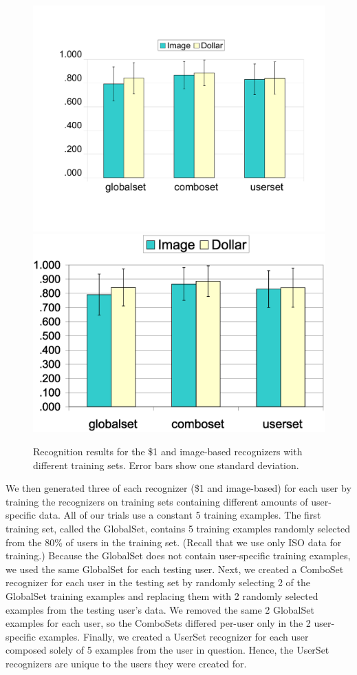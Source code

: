 \documentclass{egpubl}
\begin{document}
\begin{figure}
\ifpdf \includegraphics[width=1.0\hsize]{user_summary}
\else \includegraphics[width=1.0\hsize]{user_summary.eps} \fi
\caption{Recognition results for the \$1 and image-based recognizers with different training sets. Error bars show one standard deviation.}
\label{usersGraph}
\end{figure}

We then generated three of each recognizer (\$1 and image-based) for each user by training the recognizers on training sets containing different amounts of user-specific data.  All of our trials use a constant 5 training examples.  The first training set, called the GlobalSet, contains 5 training examples randomly selected from the 80\% of users in the training set.  (Recall that we use only ISO data for training.)  Because the GlobalSet does not contain user-specific training examples, we used the same GlobalSet for each testing user.  Next, we created a ComboSet recognizer for each user in the testing set by randomly selecting 2 of the GlobalSet training examples and replacing them with 2 randomly selected examples from the testing user's data. We removed the same 2 GlobalSet examples for each user, so the ComboSets differed per-user only in the 2 user-specific examples.  Finally, we created a UserSet recognizer for each user composed solely of 5 examples from the user in question. Hence, the UserSet recognizers are unique to the users they were created for.
\end{document}
